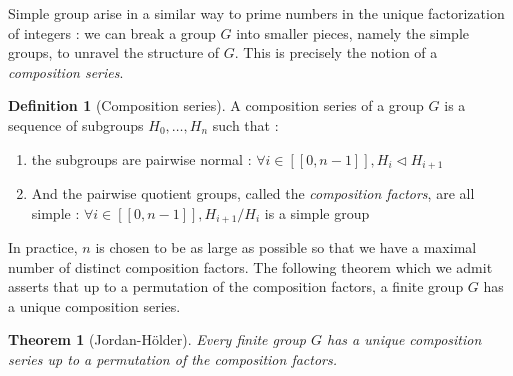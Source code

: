 \documentclass{article}
\theoremstyle{definition}
\theoremstyle{plain}
\theoremstyle{plain}
\theoremstyle{plain}
\theoremstyle{plain}
\theoremstyle{plain}
\theoremstyle{definition}
\newtheorem{defeng}[subsubsection]{Definition}
\theoremstyle{plain}
\newtheorem{thmeng}[subsubsection]{Theorem}
\theoremstyle{plain}
\newtheorem{propeng}[subsubsection]{Proposition}
\begin{document}
\par Simple group arise in a similar way to prime numbers in the unique factorization of integers : we can break a group \( G \) into smaller pieces, namely the simple groups, to unravel the structure of \( G \).
This is precisely the notion of a \textit{composition series}.

\begin{defeng}[Composition series]
	A composition series of a group \( G \) is a sequence of subgroups \( H_0, \ldots, H_n \) such that :
	\begin{enumerate}[label = (\roman*)]
	\item the subgroups are pairwise normal : 
		\( \forall i \in [\![0,n-1]\!], H_i \triangleleft H_{i+1} \)
	\item And the pairwise quotient groups, called the \textit{composition factors}, are all simple :
		\( \forall i \in [\![0,n-1]\!], H_{i+1}/H_{i} \) is a simple group

	\end{enumerate}
\par In practice, \( n \) is chosen to be as large as possible so that we have
a maximal number of distinct composition factors. The following theorem which we admit asserts that up to a permutation of the composition factors, a finite group \( G \) has a unique composition series.

\begin{thmeng}[Jordan-Hölder]
	Every finite group \( G \) has a unique composition series up to a permutation of the composition factors.	
\end{thmeng}
\end{defeng}



	

\clearpage

\printbibliography
\end{document}
